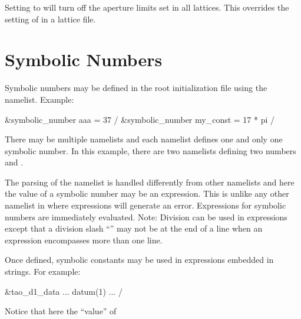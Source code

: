 {{{{{{{{Setting  to  will turn off the aperture limits set in all
lattices. This overrides the setting of  in a lattice file.

\section{Symbolic Numbers}
\label{s:init.sym} 

Symbolic numbers may be defined in the root initialization file using the 
namelist. Example:
\begin{example}
  &symbolic_number aaa = 37 /
  &symbolic_number my_const = 17 * pi /
\end{example}
There may be multiple  namelists and each namelist defines one and only one
symbolic number. In this example, there are two namelists defining two numbers  and
. 

The parsing of the  namelist is handled differently from other namelists and
here the value of a symbolic number may be an expression. This is unlike any other namelist in \tao
where expressions will generate an error. Expressions for symbolic numbers are immediately
evaluated. Note: Division can be used in expressions except that a division slash ``\vn{/}'' may
not be at the end of a line when an expression encompasses more than one line.

Once defined, symbolic constants may be used in expressions embedded in strings. For example:
\begin{example}
  &tao_d1_data
    ...
    datum(1)%
    ...
  /
\end{example}
Notice that here the ``value'' of \vn{datum(1)%
the namelist is parsed.

Besides setting symbolic numbers in the main initialization file, symbolic numbers can be defined
using the \vn{set symbolic_number} command (\sref{s:set.symbolic}) and a list of symbolic numbers
can be printed using the \vn{show symbolic_number} command (\sref{s:show.symbolic}).

\section{Global Parameter Initialization}
\index{initialization!globals}
\label{s:globals} 

}}}}}}}}}

